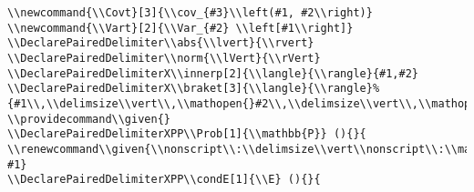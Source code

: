 \documentclass[c]{article}
\DeclareMathOperator{\Var}{Var}
\DeclareMathOperator{\cov}{Cov}
\DeclareMathOperator{\E}{\mathbb{E}}
\newcommand{\Covt}[3]{\cov_{#3}\left(#1, #2\right)}
\newcommand{\Vart}[2]{\Var_{#2} \left[#1\right]}
\DeclarePairedDelimiter\abs{\lvert}{\rvert}
\DeclarePairedDelimiter\norm{\lVert}{\rVert}
\providecommand\given{}
\renewcommand\given{\nonscript\:\delimsize\vert\nonscript\:\mathopen{}}
\renewcommand\given{\nonscript\:\delimsize\vert\nonscript\:\mathopen{}}
\renewcommand\given{\nonscript\:\delimsize\vert\nonscript\:\mathopen{}}
\renewcommand\given{\nonscript\:\delimsize\vert\nonscript\:\mathopen{}}
\theoremstyle{plain}%
\theoremstyle{definition}
\theoremstyle{remark}
\begin{document}
\begin{verbatim}
\\newcommand{\\Covt}[3]{\\cov_{#3}\\left(#1, #2\\right)}
\\newcommand{\\Vart}[2]{\\Var_{#2} \\left[#1\\right]}
\\DeclarePairedDelimiter\\abs{\\lvert}{\\rvert}
\\DeclarePairedDelimiter\\norm{\\lVert}{\\rVert}
\\DeclarePairedDelimiterX\\innerp[2]{\\langle}{\\rangle}{#1,#2}
\\DeclarePairedDelimiterX\\braket[3]{\\langle}{\\rangle}%
{#1\\,\\delimsize\\vert\\,\\mathopen{}#2\\,\\delimsize\\vert\\,\\mathopen{}#3}
\\providecommand\\given{}
\\DeclarePairedDelimiterXPP\\Prob[1]{\\mathbb{P}} (){}{
\\renewcommand\\given{\\nonscript\\:\\delimsize\\vert\\nonscript\\:\\mathopen{}}
#1}
\\DeclarePairedDelimiterXPP\\condE[1]{\\E} (){}{

\end{verbatim}
\end{document}
